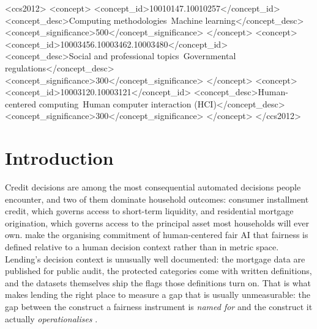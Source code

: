 \documentclass[sigconf,nonacm]{acmart}
\begin{document}
\begin{abstract}
The implication is that a fairness verdict is not a property of the model
alone; it is a property of the model plus an unrecorded configuration. The
same data honestly support ``worst-treated group at $0.67$,'' ``at $0.90$,''
or ``unknowable,'' depending on choices no reader can see, and every wrong
verdict we measured erred toward the clean, reassuring direction. An audit
should therefore ship its configuration the way results ship error bars. We
close with the six-item record that would accomplish this, and with
appendices that print the full cell tables and a claim-by-claim map from
every number to the artifact that regenerates it.
\end{abstract}

\begin{CCSXML}
<ccs2012>
<concept>
<concept_id>10010147.10010257</concept_id>
<concept_desc>Computing methodologies~Machine learning</concept_desc>
<concept_significance>500</concept_significance>
</concept>
<concept>
<concept_id>10003456.10003462.10003480</concept_id>
<concept_desc>Social and professional topics~Governmental regulations</concept_desc>
<concept_significance>300</concept_significance>
</concept>
<concept>
<concept_id>10003120.10003121</concept_id>
<concept_desc>Human-centered computing~Human computer interaction (HCI)</concept_desc>
<concept_significance>300</concept_significance>
</concept>
</ccs2012>
\end{CCSXML}



\maketitle

\section{Introduction}
\label{sec:intro}

Credit decisions are among the most consequential automated decisions people
encounter, and two of them dominate household outcomes: consumer installment
credit, which governs access to short-term liquidity, and residential mortgage
origination, which governs access to the principal asset most households will
ever own. \citet{lee2020} make the organising commitment of human-centered
fair AI that fairness is defined relative to a human decision context rather
than in metric space. Lending's decision context is unusually well
documented: the mortgage data are published for public audit, the protected
categories come with written definitions, and the datasets themselves ship the
flags those definitions turn on. That is what makes lending the right place to
measure a gap that is usually unmeasurable: the gap between the construct a
fairness instrument is \emph{named for} and the construct it actually
\emph{operationalises} \citep{jacobswallach2021}.
\end{document}
